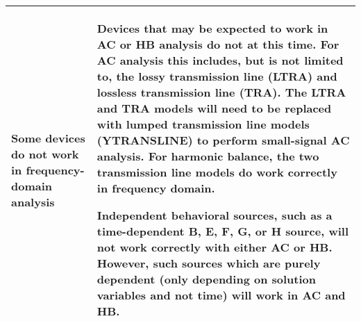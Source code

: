 \begin{longtable}[h] {>{\raggedright\small}m{2in}|>{\raggedright\let\\\tabularnewline\small}m{3.5in}}
    Some devices do not work in frequency-domain analysis & Devices
    that may be expected to work in AC or HB analysis do not at this
    time.  For AC analysis this includes, but is not limited to, the
    lossy transmission line (LTRA) and lossless transmission line
    (TRA).  The LTRA and TRA models will need to be replaced with
    lumped transmission line models (YTRANSLINE) to perform
    small-signal AC analysis.  For harmonic balance, the two
    transmission line models do work correctly in frequency domain.

    Independent behavioral sources, such as a time-dependent B, E, F, G, or H 
    source, will not work correctly with either AC or HB. 
    However, such sources which are purely dependent (only depending on solution 
    variables and not time) will work in AC and HB.
    \\ \hline

\end{longtable}

